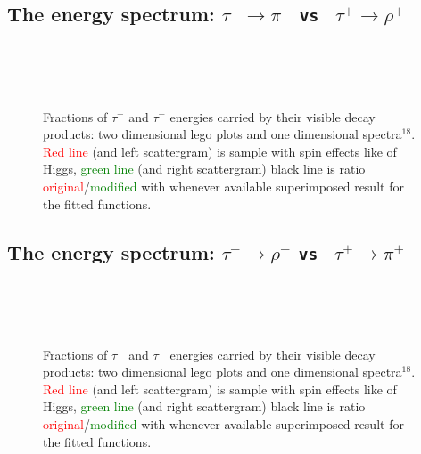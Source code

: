 \newpage
\subsection{The energy spectrum: $\tau^- \to \pi^-$ {\tt vs } $\tau^+ \to \rho^+$}
\vspace{1\baselineskip}

\begin{figure}[h!]
\centering
{}
 \\
 \\
 \\
\caption{\small Fractions of  $\tau^+$ and $\tau^-$ energies carried by their visible  decay products:
two dimensional lego plots and one dimensional spectra$^{18}$.
\textcolor{red}{Red line} (and left scattergram) is sample with spin effects like of Higgs,
\textcolor{green}{green line} (and right scattergram) \greenlineis
black line is ratio \textcolor{red}{original}/\textcolor{green}{modified} with whenever available superimposed result for the
fitted functions.
}
\end{figure}

\newpage
\subsection{The energy spectrum: $\tau^- \to \rho^-$ {\tt vs } $\tau^+ \to \pi^+$}
\vspace{1\baselineskip}

\begin{figure}[h!]
\centering
{}
 \\
 \\
 \\
\caption{\small Fractions of  $\tau^+$ and $\tau^-$ energies carried by their visible  decay products:
two dimensional lego plots and one dimensional spectra$^{18}$.
\textcolor{red}{Red line} (and left scattergram) is sample with spin effects like of Higgs,
\textcolor{green}{green line} (and right scattergram) \greenlineis
black line is ratio \textcolor{red}{original}/\textcolor{green}{modified} with whenever available superimposed result for the
fitted functions.
}
\end{figure}


